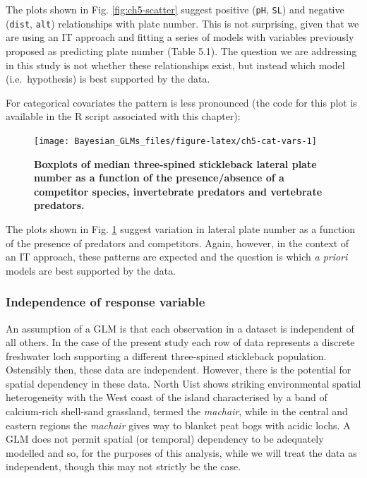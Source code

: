 \documentclass[
]{book}
\begin{document}
The plots shown in Fig. \ref{fig:ch5-scatter} suggest positive (\texttt{pH}, \texttt{SL}) and negative (\texttt{dist}, \texttt{alt}) relationships with plate number. This is not surprising, given that we are using an IT approach and fitting a series of models with variables previously proposed as predicting plate number (Table 5.1). The question we are addressing in this study is not whether these relationships exist, but instead which model (i.e.~hypothesis) is best supported by the data.

For categorical covariates the pattern is less pronounced (the code for this plot is available in the R script associated with this chapter):



\begin{figure}

{\centering \texttt{[image: Bayesian\_GLMs\_files/figure-latex/ch5-cat-vars-1]} 

}

\caption{\textbf{Boxplots of median three-spined stickleback lateral plate number as a function of the presence/absence of a competitor species, invertebrate predators and vertebrate predators.}}\label{fig:ch5-cat-vars}
\end{figure}

The plots shown in Fig. \ref{fig:ch5-cat-vars} suggest variation in lateral plate number as a function of the presence of predators and competitors. Again, however, in the context of an IT approach, these patterns are expected and the question is which \emph{a priori} models are best supported by the data.

\hypertarget{pois-indep}{%
\subsubsection{Independence of response variable}\label{pois-indep}}

An assumption of a GLM is that each observation in a dataset is independent of all others. In the case of the present study each row of data represents a discrete freshwater loch supporting a different three-spined stickleback population. Ostensibly then, these data are independent. However, there is the potential for spatial dependency in these data. North Uist shows striking environmental spatial heterogeneity with the West coast of the island characterised by a band of calcium-rich shell-sand grassland, termed the \emph{machair}, while in the central and eastern regions the \emph{machair} gives way to blanket peat bogs with acidic lochs. A GLM does not permit spatial (or temporal) dependency to be adequately modelled and so, for the purposes of this analysis, while we will treat the data as independent, though this may not strictly be the case.
\end{document}
